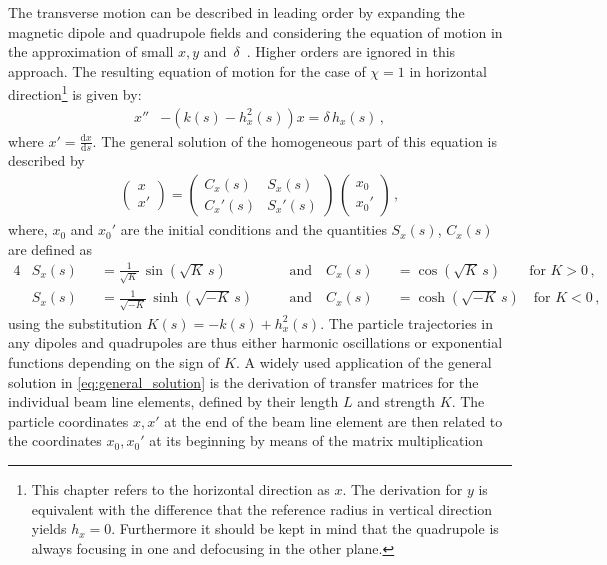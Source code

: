 The transverse motion can be described in leading order by expanding the magnetic dipole and quadrupole fields and considering the equation of motion in the approximation of small $x,y$ \mbox{and $\delta$}~\cite{lee2012accelerator}. Higher orders are ignored in this approach. The resulting equation of motion for the case of $\chi=1$ in horizontal direction\footnote{This chapter refers to the horizontal direction as $x$. The derivation for $y$ is equivalent with the difference that the reference radius in vertical direction yields $h_x=0$. Furthermore it should be kept in mind that the quadrupole is always focusing in one and defocusing in the other plane.} is given by:
\begin{align}
x'' &- \left(k(s) - h_x^2(s)\right) x = \delta \, h_x (s) \, , \label{eq:hill1} 
\end{align}
%
where $x'= \frac{\mathrm{d}x}{\mathrm{d}s}$. The general solution of the homogeneous part of this equation is described by 
\begin{align}
\begin{pmatrix} x \\ x' \end{pmatrix} = \begin{pmatrix} C_x (s) & S_x(s) \\ C_x'(s) & S_x'(s)  \end{pmatrix} \, \begin{pmatrix} x_0 \\ x_0' \end{pmatrix}\, , \label{eq:general_solution}
\end{align}
where, $x_0$ and $x_0'$ are the initial conditions and  the quantities $S_x(s)$, $C_x(s)$ are defined as
%
\begin{alignat}{4}
&S_x(s) &&= \frac{1}{\sqrt{K}} \, \sin \left( \sqrt{K} \, s \right) \quad && \text{and}  \quad  C_x (s) &&= \cos \left(\sqrt{K} \, s\right) \quad \quad \text{for } K>0 \,,\\ 
&S_x(s) &&= \frac{1}{\sqrt{-K}} \, \sinh \left( \sqrt{-K} \, s \right)  \quad && \text{and}  \quad   C_x (s) &&= \cosh \left(\sqrt{-K} \, s\right) \quad  \text{for } K<0\, ,
\end{alignat}
%
using the substitution $K(s) = -k(s)+h_x^2(s)$. The particle trajectories in any dipoles and quadrupoles are thus either harmonic oscillations or exponential functions depending on the sign of $K$. A widely used application of the general solution in \eqref{eq:general_solution} is the derivation of transfer matrices for the individual beam line elements, defined by their length $L$ and strength $K$. The particle coordinates $x,x'$ at the end of the beam line element are then related to the coordinates $x_0,x_0'$ at its beginning by means of the matrix multiplication
